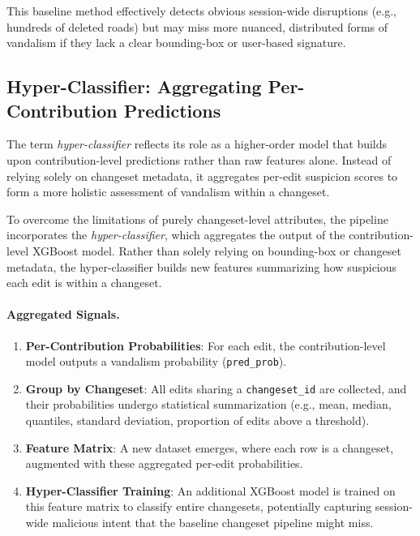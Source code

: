\documentclass[
    13pt, %
    a4paper, %
    listof=totoc, %
    bibliography=totoc, %
    index=totoc, %
    headsepline
]{scrreprt}
\begin{document}
This baseline method effectively detects obvious session-wide disruptions (e.g., hundreds of deleted roads) but may miss more nuanced, distributed forms of vandalism if they lack a clear bounding-box or user-based signature.

\subsection{Hyper-Classifier: Aggregating Per-Contribution Predictions}
\label{subsec:hyper_classifier}

The term \emph{hyper-classifier} reflects its role as a higher-order model that builds upon contribution-level predictions rather than raw features alone. Instead of relying solely on changeset metadata, it aggregates per-edit suspicion scores to form a more holistic assessment of vandalism within a changeset.

To overcome the limitations of purely changeset-level attributes, the pipeline incorporates the \emph{hyper-classifier}, which aggregates the output of the contribution-level XGBoost model. Rather than solely relying on bounding-box or changeset metadata, the hyper-classifier builds new features summarizing how suspicious each edit is within a changeset.


\paragraph{Aggregated Signals.}
\begin{enumerate}
    \item \textbf{Per-Contribution Probabilities}: For each edit, the contribution-level model outputs a vandalism probability (\texttt{pred\_prob}).
    \item \textbf{Group by Changeset}: All edits sharing a \texttt{changeset\_id} are collected, and their probabilities undergo statistical summarization (e.g., mean, median, quantiles, standard deviation, proportion of edits above a threshold).
    \item \textbf{Feature Matrix}: A new dataset emerges, where each row is a changeset, augmented with these aggregated per-edit probabilities.
    \item \textbf{Hyper-Classifier Training}: An additional XGBoost model is trained on this feature matrix to classify entire changesets, potentially capturing session-wide malicious intent that the baseline changeset pipeline might miss.
\end{enumerate}
\end{document}
